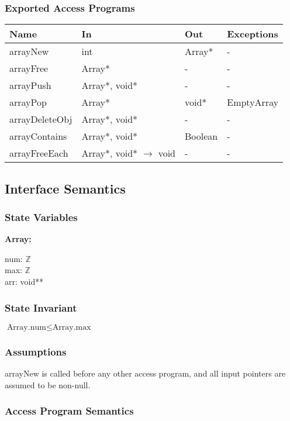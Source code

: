 \documentclass[12pt]{article}
\newcommand{\Z}{$\mathbb{Z}$}
\begin{document}
\subsubsection{Exported Access Programs} \label{SecEAPSequence}
	\renewcommand*{\arraystretch}{1.2}
	\begin{longtable}{| y | x{3.5cm} | y | x{3.5cm} |}
	\hline \textbf{Name} & \textbf{In} & \textbf{Out} & \textbf{Exceptions} \\ \hline 
	arrayNew & int & Array* & - \\ \hline
	arrayFree & Array* & - & - \\ \hline
	arrayPush & Array*, void* & - & - \\ \hline
	arrayPop & Array* & void* & EmptyArray \\ \hline
	arrayDeleteObj & Array*, void* & - & - \\ \hline
	arrayContains & Array*, void* & Boolean & - \\ \hline
	arrayFreeEach & Array*, void* $\to$ void & - & - \\ \hline
\end{longtable}

\subsection{Interface Semantics}

\subsubsection{State Variables} \label{SecSVSequence}
\textbf{Array:} 
\begin{multicols}{3}
	\noindent num: \Z \\
	max: \Z \\
	arr: void**
\end{multicols}

\subsubsection{State Invariant} \label{SecSISequence}
	$\text{Array.num} \le \text{Array.max}$

\subsubsection{Assumptions} \label{SecASequence}
	arrayNew is called before any other access program, and all input pointers are assumed to be non-null.

\subsubsection{Access Program Semantics} \label{SecAPSSequence}
\end{document}
